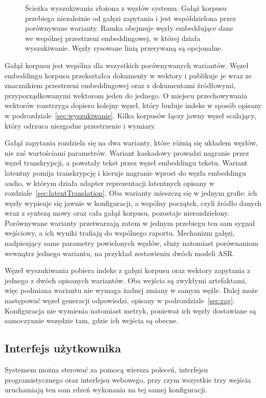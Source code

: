 \begin{figure}[htbp]
    \centering
    \caption{Ścieżka wyszukiwania złożona z węzłów systemu. Gałąź korpusu przebiega niezależnie
    od gałęzi zapytania i jest współdzielona przez porównywane warianty.
    Ramka obejmuje węzły embeddujące dane we wspólnej przestrzeni embeddingowej, w której działa
    wyszukiwanie. Węzły rysowane linią przerywaną są opcjonalne.}
    \label{fig:grafWyszukiwania}
\end{figure}

Gałąź korpusu jest wspólna dla wszystkich porównywanych wariantów. Węzeł embeddingu korpusu
przekształca dokumenty w wektory i publikuje je wraz ze znacznikiem przestrzeni embeddingowej oraz
z dokumentami źródłowymi, przyporządkowanymi wektorom jeden do jednego. O miejscu przechowywania
wektorów rozstrzyga dopiero kolejny węzeł, który buduje indeks w sposób opisany w
podrozdziale~\ref{sec:wyszukiwanie}. Kilka korpusów łączy jawny węzeł scalający, który odrzuca
niezgodne przestrzenie i wymiary.

Gałąź zapytania rozdziela się na dwa warianty, które różnią się układem węzłów, nie zaś
wartościami parametrów. Wariant kaskadowy prowadzi nagranie przez węzeł transkrypcji, a
powstały tekst przez węzeł embeddingu tekstu. Wariant latentny pomija transkrypcję i kieruje
nagranie wprost do węzła embeddingu audio, w którym działa adapter reprezentacji latentnych
opisany w rozdziale~\ref{sec:latentTranslation}. Oba warianty mieszczą się w jednym grafie: ich
węzły wypisuje się jawnie w konfiguracji, a wspólny początek, czyli źródło danych wraz z syntezą
mowy oraz cała gałąź korpusu, pozostaje nierozdzielony. Porównywane warianty przetwarzają zatem
w jednym przebiegu ten sam sygnał wejściowy, a ich wyniki trafiają do wspólnego raportu.
Mechanizm gałęzi, nadpisujący same parametry powielonych węzłów, służy natomiast porównaniom
wewnątrz jednego wariantu, na przykład zestawieniu dwóch modeli ASR.

Węzeł wyszukiwania pobiera indeks z gałęzi korpusu oraz wektory zapytania z jednego z dwóch
opisanych wariantów. Oba wejścia są zwykłymi artefaktami, więc podmiana wariantu nie wymaga żadnej zmiany
w samym węźle. Dalej może następować węzeł generacji odpowiedzi, opisany
w podrozdziale~\ref{sec:rag}. Konfiguracja nie wymienia
natomiast metryk, ponieważ ich węzły dostawiane są samoczynnie wszędzie tam, gdzie ich
wejścia są obecne.

\subsection{Interfejs użytkownika}
\label{sec:interfejs}
Systemem można sterować za pomocą wiersza poleceń, interfejsu programistycznego oraz interfejsu
webowego, przy czym wszystkie trzy wejścia uruchamiają ten sam rdzeń wykonania na tej samej
konfiguracji.

